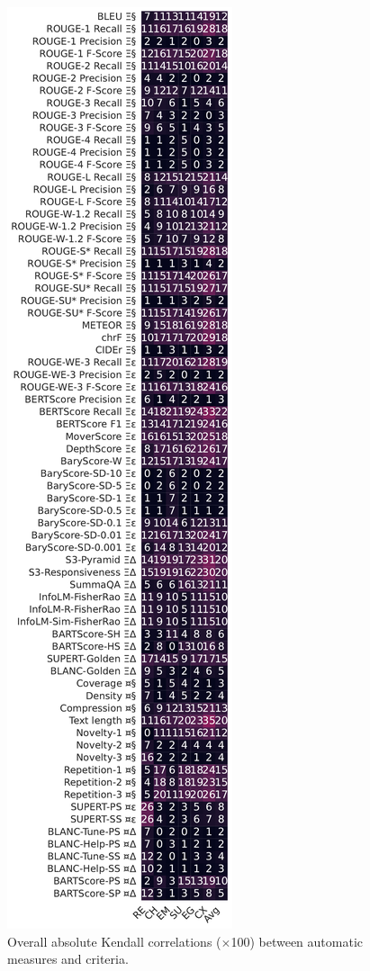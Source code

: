 \begin{figure}[h]
    \centering
    \includegraphics[width=0.375\columnwidth]{pictures/mixed_story_kendall.pdf}
    \caption{Overall absolute Kendall correlations ($\times$100) between automatic measures and criteria.}
    \label{fig:overall_mixed_correlations_kendall}
\end{figure}

